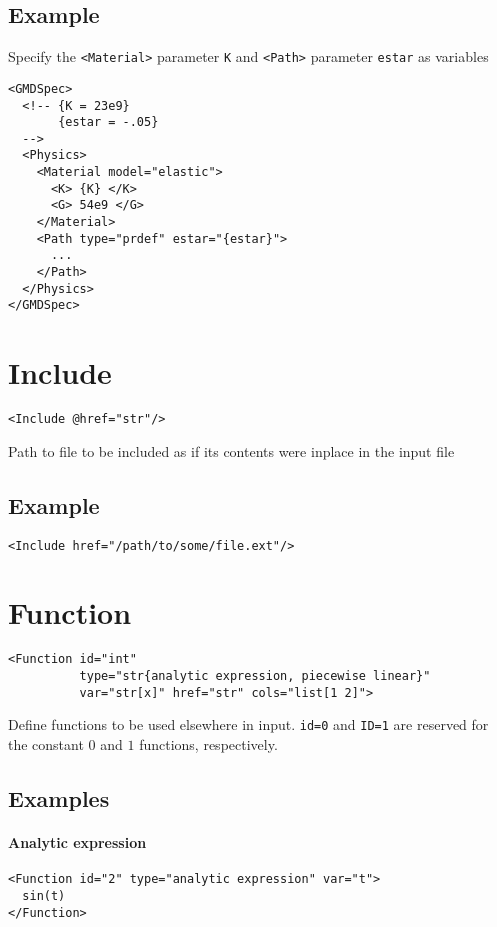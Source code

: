 \documentclass[11pt]{report}
\newcommand{\tag}[1]{\texttt{<#1>}}
\begin{document}
\subsection{Example}
Specify the \tag{Material} parameter \texttt{K} and \tag{Path} parameter
\texttt{estar} as variables
\begin{verbatim}
<GMDSpec>
  <!-- {K = 23e9}
       {estar = -.05}
  -->
  <Physics>
    <Material model="elastic">
      <K> {K} </K>
      <G> 54e9 </G>
    </Material>
    <Path type="prdef" estar="{estar}">
      ...
    </Path>
  </Physics>
</GMDSpec>
\end{verbatim}

\section{Include}
\begin{verbatim}
<Include @href="str"/>
\end{verbatim}
%
Path to file to be included as if its contents were inplace in the input file

\subsection{Example}
\begin{verbatim}
<Include href="/path/to/some/file.ext"/>
\end{verbatim}

\section{Function}
\begin{verbatim}
<Function id="int"
          type="str{analytic expression, piecewise linear}"
          var="str[x]" href="str" cols="list[1 2]">
\end{verbatim}
%
Define functions to be used elsewhere in input. \texttt{id=0} and
\texttt{ID=1} are reserved for the constant $0$ and $1$ functions,
respectively.

\subsection{Examples}
\paragraph{Analytic expression}
%
\begin{verbatim}
<Function id="2" type="analytic expression" var="t">
  sin(t)
</Function>
\end{verbatim}
\end{document}
